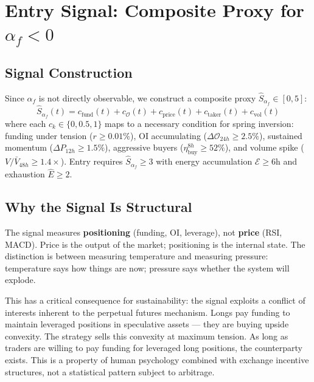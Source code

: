 \documentclass[11pt,a4paper]{article}
\newcommand{\af}{\alpha_f}
\newcommand{\score}{\hat{S}_{\alpha_f}}
\newcommand{\exh}{\hat{E}}
\newcommand{\OI}{\mathcal{O}}
\begin{document}
\section{Entry Signal: Composite Proxy for $\af < 0$}
\label{sec:signal}

\subsection{Signal Construction}

Since $\af$ is not directly observable, we construct a composite proxy $\score \in [0,5]$:
\begin{equation}
\score(t) = c_{\text{fund}}(t) + c_{\OI}(t) + c_{\text{price}}(t) + c_{\text{taker}}(t) + c_{\text{vol}}(t)
\end{equation}
where each $c_k \in \{0, 0.5, 1\}$ maps to a necessary condition for spring inversion: funding under tension ($r \geq 0.01\%$), OI accumulating ($\Delta\OI_{24h} \geq 2.5\%$), sustained momentum ($\Delta P_{12h} \geq 1.5\%$), aggressive buyers ($\eta_{\text{buy}}^{8h} \geq 52\%$), and volume spike ($V/\bar{V}_{48h} \geq 1.4\times$). Entry requires $\score \geq 3$ with energy accumulation $\mathcal{E} \geq 6$h and exhaustion $\exh \geq 2$.

\subsection{Why the Signal Is Structural}

The signal measures \textbf{positioning} (funding, OI, leverage), not \textbf{price} (RSI, MACD). Price is the output of the market; positioning is the internal state. The distinction is between measuring temperature and measuring pressure: temperature says how things are now; pressure says whether the system will explode.

This has a critical consequence for sustainability: the signal exploits a conflict of interests inherent to the perpetual futures mechanism. Longs pay funding to maintain leveraged positions in speculative assets --- they are buying upside convexity. The strategy sells this convexity at maximum tension. As long as traders are willing to pay funding for leveraged long positions, the counterparty exists. This is a property of human psychology combined with exchange incentive structures, not a statistical pattern subject to arbitrage.
\end{document}
